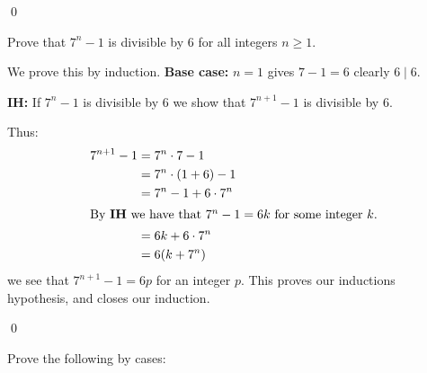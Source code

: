 \documentclass[addpoints]{exam}
\begin{document}
\begin{questions}
\begin{solution}
      \qed
    \end{solution}
  
  \question[6] Prove that $7^n -1$ is divisible by 6 for all integers $n\geq 1$.
  \vspace*{\fill}
  \begin{solution}
    We prove this by induction. \textbf{Base case:} $n=1$ gives $7-1 = 6$ clearly $6\mid 6$.

    \textbf{IH:} If $7^n -1$ is divisible by 6 we show that $7^{n+1} - 1$ is divisible by 6.

    Thus:
    \begin{align*}
      7^{n+1} - 1 &= 7^n\cdot 7 - 1\\
      &= 7^n\cdot (1 + 6) - 1\\
      &= 7^n - 1 + 6\cdot 7^n\\
      \intertext{By \textbf{IH} we have that $7^n -1 = 6k$ for some integer $k$.}
      &= 6k + 6\cdot 7^n\\
      &= 6(k+7^n)\\
    \end{align*}
    we see that $7^{n+1}-1 = 6p$ for an integer $p$. This proves our inductions hypothesis, and closes our induction.

    \qed
  \end{solution}

  \question[8] Prove the following by cases:
\end{questions}
\end{document}
